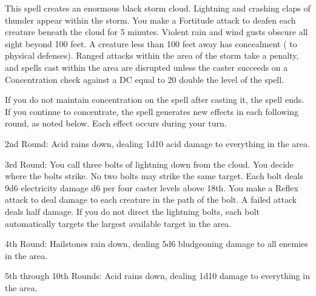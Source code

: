 \spellrng{\rngfar}
\begin{spelleffect}
  This spell creates an enormous black storm cloud. Lightning and crashing claps of thunder appear within the storm. You make a Fortitude attack to deafen each creature beneath the cloud for 5 minutes. Violent rain and wind gusts obscure all sight beyond 100 feet. A creature less than 100 feet away has concealment ( to physical defenses). Ranged attacks within the area of the storm take a  penalty, and spells cast within the area are disrupted unless the caster succeeds on a Concentration check against a DC equal to 20 \add double the level of the spell.
  \par If you do not maintain concentration on the spell after casting it, the spell ends. If you continue to concentrate, the spell generates new effects in each following round, as noted below. Each effect occurs during your turn.
  \par 2nd Round: Acid rains down, dealing 1d10 acid damage to everything in the area.
  \par 3rd Round: You call three bolts of lightning down from the cloud. You decide where the bolts strike. No two bolts may strike the same target. Each bolt deals 9d6 electricity damage \add d6 per four caster levels above 18th. You make a Reflex attack to deal damage to each creature in the path of the bolt. A failed attack deals half damage. If you do not direct the lightning bolts, each bolt automatically targets the largest available target in the area.
  \par 4th Round: Hailstones rain down, dealing 5d6 bludgeoning damage to all enemies in the area.
  \par 5th through 10th Rounds: Acid rains down, dealing 1d10 damage to everything in the area.
\end{spelleffect}


